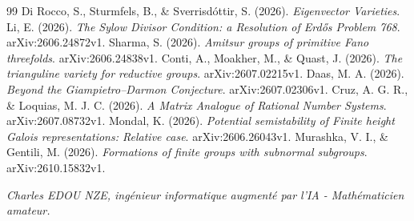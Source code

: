 \documentclass[
]{article}
\begin{document}
\begin{thebibliography}{99}
 Di Rocco, S., Sturmfels, B., \& Sverrisdóttir, S. (2026). \textit{Eigenvector Varieties}.
 Li, E. (2026). \textit{The Sylow Divisor Condition: a Resolution of Erdős Problem 768}. arXiv:2606.24872v1.
 Sharma, S. (2026). \textit{Amitsur groups of primitive Fano threefolds}. arXiv:2606.24838v1.
 Conti, A., Moakher, M., \& Quast, J. (2026). \textit{The trianguline variety for reductive groups}. arXiv:2607.02215v1.
 Daas, M. A. (2026). \textit{Beyond the Giampietro--Darmon Conjecture}. arXiv:2607.02306v1.
 Cruz, A. G. R., \& Loquias, M. J. C. (2026). \textit{A Matrix Analogue of Rational Number Systems}. arXiv:2607.08732v1.
 Mondal, K. (2026). \textit{Potential semistability of Finite height Galois representations: Relative case}. arXiv:2606.26043v1.
 Murashka, V. I., \& Gentili, M. (2026). \textit{Formations of finite groups with subnormal subgroups}. arXiv:2610.15832v1.
\end{thebibliography}



\vspace{1cm}
\begin{flushright}
\textit{Charles EDOU NZE, ingénieur informatique augmenté par l'IA - Mathématicien amateur.}
\end{flushright}
\end{document}
